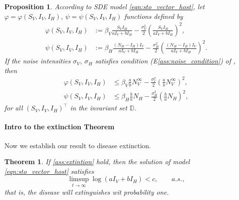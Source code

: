 \documentclass{amsart}
\theoremstyle{plain}
\newtheorem{theorem}{Theorem}
\newtheorem{proposition}{Proposition}
\theoremstyle{definition}
\begin{document}
        \begin{proposition}
            According to SDE model \eqref{eqn:sto_vector_host},
            let $\varphi = \varphi (S_V, I_V, I_H)$, 
            $\psi = \psi (S_V, I_V, I_H)$ 
            functions defined by
            \begin{equation}
                \begin{aligned}
                    \varphi (S_V, I_V, I_H) &:= 
                        \beta_V \frac{S_V I_H}{a I_V + b I_H}
                        - 
                        \frac{\sigma_V ^ 2}{2} 
                        \left(
                            \frac{S_V I_H}{a I_V + b I_H}
                        \right) ^2,
                    \\
                    \psi (S_V, I_V, I_H) &:=
                    \beta_H \frac{(N_H - I_H)  I_V}{a I_V + b I_H}
                        - 
                        \frac{\sigma_H ^ 2}{2} 
                        \left(
                            \frac{(N_H - I_H)  I_V}{a I_V + b I_H}
                        \right) ^2.
                \end{aligned}
            \end{equation}
            If the noise intensities $\sigma_V$, $\sigma_H$ satisfies condition 
            (E\textendash\ref{ass:noise_condition})
            of , then
            \begin{equation}
                \begin{aligned}
                  \varphi (S_V, I_V, I_H) & \leq \beta_V \frac{a}{b} N_V ^ 
                  {\infty}
                 - \frac{\sigma_v ^ 2}{2}
                  \left(
                          \frac{a}{b} N_V ^ {\infty}
                      \right) ^ 2,
                  \\
                  \psi (S_V, I_V, I_H) & \leq
                      \beta_H \frac{b}{a} N_H - \frac{\sigma_H ^ 2}{2}
                      \left(
                          \frac{b}{a} N_H
                      \right) ^ 2,
                \end{aligned}
            \end{equation}
        for all $(S_V, I_V, I_H)^{\top}$ in the invariant set $\mathbb{D}$.
        \end{proposition}
%
%
%
%
%
%
    \paragraph{Intro to the extinction Theorem}
    Now we establish our result to disease extinction.
    \begin{theorem}
        If \cref{ass:extintion} hold, then the solution of model 
        \eqref{eqn:sto_vector_host} satisfies
        \begin{equation}
            \limsup_{t \to \infty}
                \log(aI_V + b I_H) < c , \qquad a.s.,
        \end{equation}
    that is, the disease will extinguishes wit probability one.
    \end{theorem}
%
%
\end{document}
